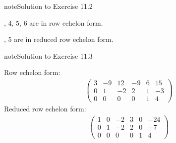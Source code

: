 \documentclass[letterpaper,10pt,english]{jupyterBook}
\begin{document}
\begin{sphinxadmonition}{note}{Solution to Exercise 11.2}



, 4, 5, 6 are in row echelon form.

, 5 are in reduced row echelon form.
\end{sphinxadmonition}
 \label{LinearAlgebra/linear_systems_matrices/echelon_form:LinearAlgebra/linear_systems_matrices/echelon_form-solution-6}

\begin{sphinxadmonition}{note}{Solution to Exercise 11.3}



\sphinxAtStartPar
Row echelon form:
\begin{equation*}
\begin{split}
\begin{pmatrix}
3 & -9 & 12  & -9 & 6 & 15\\
0 & 1 & -2 & 2 & 1 & -3\\
0 & 0 & 0 & 0 & 1 & 4
\end{pmatrix}
\end{split}
\end{equation*}
\sphinxAtStartPar
Reduced row echelon form:
\begin{equation*}
\begin{split}
\begin{pmatrix}
1 & 0 & -2  & 3 & 0 & -24\\
0 & 1 & -2 & 2 & 0 & -7\\
0 & 0 & 0 & 0 & 1 & 4
\end{pmatrix}
\end{split}
\end{equation*}\end{sphinxadmonition}
 \label{LinearAlgebra/linear_systems_matrices/echelon_form:LinearAlgebra/linear_systems_matrices/echelon_form-solution-7}
\end{document}
